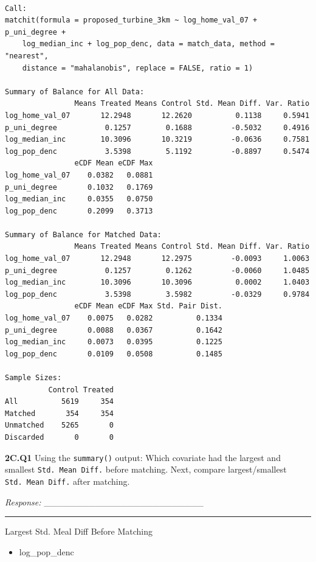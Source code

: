\documentclass[
  letterpaper,
  DIV=11,
  numbers=noendperiod]{scrartcl}
\providecommand{\tightlist}{%
  \setlength{\itemsep}{0pt}\setlength{\parskip}{0pt}}
\begin{document}
\begin{verbatim}

Call:
matchit(formula = proposed_turbine_3km ~ log_home_val_07 + p_uni_degree + 
    log_median_inc + log_pop_denc, data = match_data, method = "nearest", 
    distance = "mahalanobis", replace = FALSE, ratio = 1)

Summary of Balance for All Data:
                Means Treated Means Control Std. Mean Diff. Var. Ratio
log_home_val_07       12.2948       12.2620          0.1138     0.5941
p_uni_degree           0.1257        0.1688         -0.5032     0.4916
log_median_inc        10.3096       10.3219         -0.0636     0.7581
log_pop_denc           3.5398        5.1192         -0.8897     0.5474
                eCDF Mean eCDF Max
log_home_val_07    0.0382   0.0881
p_uni_degree       0.1032   0.1769
log_median_inc     0.0355   0.0750
log_pop_denc       0.2099   0.3713

Summary of Balance for Matched Data:
                Means Treated Means Control Std. Mean Diff. Var. Ratio
log_home_val_07       12.2948       12.2975         -0.0093     1.0063
p_uni_degree           0.1257        0.1262         -0.0060     1.0485
log_median_inc        10.3096       10.3096          0.0002     1.0403
log_pop_denc           3.5398        3.5982         -0.0329     0.9784
                eCDF Mean eCDF Max Std. Pair Dist.
log_home_val_07    0.0075   0.0282          0.1334
p_uni_degree       0.0088   0.0367          0.1642
log_median_inc     0.0073   0.0395          0.1225
log_pop_denc       0.0109   0.0508          0.1485

Sample Sizes:
          Control Treated
All          5619     354
Matched       354     354
Unmatched    5265       0
Discarded       0       0
\end{verbatim}

\textbf{2C.Q1} Using the \texttt{summary()} output: Which covariate had
the largest and smallest \texttt{Std.\ Mean\ Diff.} before matching.
Next, compare largest/smallest \texttt{Std.\ Mean\ Diff.} after
matching.

\emph{Response:} \_\_\_\_\_\_\_\_\_\_\_\_\_\_\_\_\_\_\_\_\_\_\_\_\_

\begin{center}\rule{0.5\linewidth}{0.5pt}\end{center}

Largest Std. Meal Diff Before Matching

\begin{itemize}
\tightlist
\item
  log\_pop\_denc
\end{itemize}
\end{document}
